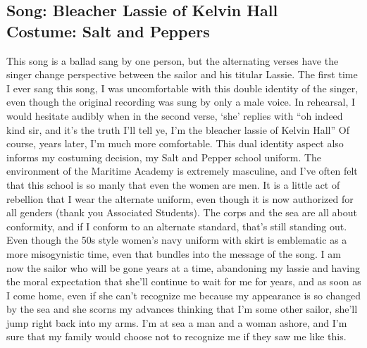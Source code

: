 \documentclass{article}[12pt,letterpaper]
\begin{document}
\subsection{Song: Bleacher Lassie of Kelvin Hall\\
Costume: Salt and Peppers}
This song is a ballad sang by one person, but the alternating verses have the singer change perspective between the sailor and his titular Lassie. The first time I ever sang this song, I was uncomfortable with this double identity of the singer, even though the original recording was sung by only a male voice. In rehearsal, I would hesitate audibly when in the second verse, ‘she’ replies with “oh indeed kind sir, and it’s the truth I’ll tell ye, I’m the bleacher lassie of Kelvin Hall” Of course, years later, I’m much more comfortable. This dual identity aspect also informs my costuming decision, my Salt and Pepper school uniform. The environment of the Maritime Academy is extremely masculine, and I’ve often felt that this school is so manly that even the women are men. It is a little act of rebellion that I wear the alternate uniform, even though it is now authorized for all genders (thank you Associated Students). The corps and the sea are all about conformity, and if I conform to an alternate standard, that’s still standing out. Even though the 50s style women’s navy uniform with skirt is emblematic as a more misogynistic time, even that bundles into the message of the song. I am now the sailor who will be gone years at a time, abandoning my lassie and having the moral expectation that she’ll continue to wait for me for years, and as soon as I come home, even if she can’t recognize me because my appearance is so changed by the sea and she scorns my advances thinking that I’m some other sailor, she’ll jump right back into my arms. I’m at sea a man and a woman ashore, and I’m sure that my family would choose not to recognize me if they saw me like this.
\end{document}
